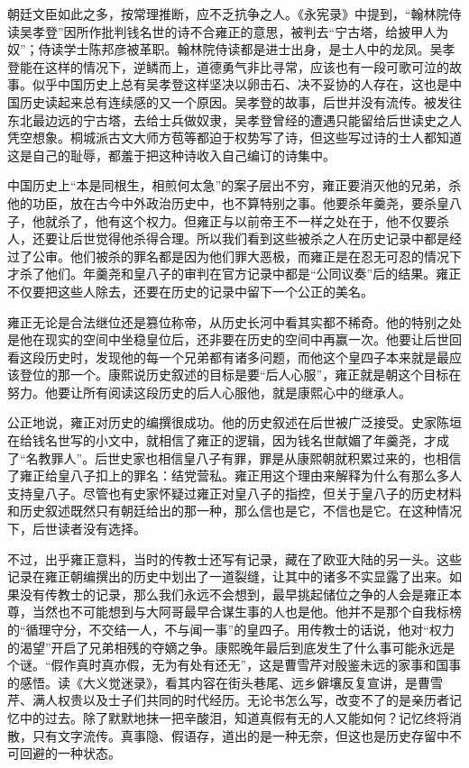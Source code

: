 朝廷文臣如此之多，按常理推断，应不乏抗争之人。《永宪录》中提到，“翰林院侍读吴孝登”因所作批判钱名世的诗不合雍正的意思，被判去“宁古塔，给披甲人为奴”；侍读学士陈邦彦被革职。翰林院侍读都是进士出身，是士人中的龙凤。吴孝登能在这样的情况下，逆鳞而上，道德勇气非比寻常，应该也有一段可歌可泣的故事。似乎中国历史上总有吴孝登这样坚决以卵击石、决不妥协的人存在，这也是中国历史读起来总有连续感的又一个原因。吴孝登的故事，后世并没有流传。被发往东北最边远的宁古塔，去给士兵做奴隶，吴孝登曾经的遭遇只能留给后世读史之人凭空想象。桐城派古文大师方苞等都迫于权势写了诗，但这些写过诗的士人都知道这是自己的耻辱，都羞于把这种诗收入自己编订的诗集中。



中国历史上“本是同根生，相煎何太急”的案子层出不穷，雍正要消灭他的兄弟，杀他的功臣，放在古今中外政治历史中，也不算特别之事。他要杀年羹尧，要杀皇八子，他就杀了，他有这个权力。但雍正与以前帝王不一样之处在于，他不仅要杀人，还要让后世觉得他杀得合理。所以我们看到这些被杀之人在历史记录中都是经过了公审。他们被杀的罪名都是因为他们罪大恶极，而雍正是在忍无可忍的情况下才杀了他们。年羹尧和皇八子的审判在官方记录中都是“公同议奏”后的结果。雍正不仅要把这些人除去，还要在历史的记录中留下一个公正的美名。



雍正无论是合法继位还是篡位称帝，从历史长河中看其实都不稀奇。他的特别之处是他在现实的空间中坐稳皇位后，还非要在历史的空间中再赢一次。他要让后世回看这段历史时，发现他的每一个兄弟都有诸多问题，而他这个皇四子本来就是最应该登位的那一个。康熙说历史叙述的目标是要“后人心服”，雍正就是朝这个目标在努力。他要让所有阅读这段历史的后人心服他，就是康熙心中的继承人。



公正地说，雍正对历史的编撰很成功。他的历史叙述在后世被广泛接受。史家陈垣在给钱名世写的小文中，就相信了雍正的逻辑，因为钱名世献媚了年羹尧，才成了“名教罪人”。后世史家也相信皇八子有罪，罪是从康熙朝就积累过来的，也相信了雍正给皇八子扣上的罪名：结党营私。雍正用这个理由来解释为什么有那么多人支持皇八子。尽管也有史家怀疑过雍正对皇八子的指控，但关于皇八子的历史材料和历史叙述既然只有朝廷给出的那一种，那么信也是它，不信也是它。在这种情况下，后世读者没有选择。


不过，出乎雍正意料，当时的传教士还写有记录，藏在了欧亚大陆的另一头。这些记录在雍正朝编撰出的历史中划出了一道裂缝，让其中的诸多不实显露了出来。如果没有传教士的记录，那么我们永远不会想到，最早挑起储位之争的人会是雍正本尊，当然也不可能想到与大阿哥最早合谋生事的人也是他。他并不是那个自我标榜的“循理守分，不交结一人，不与闻一事”的皇四子。用传教士的话说，他对“权力的渴望”开启了兄弟相残的夺嫡之争。康熙晚年最后到底发生了什么事可能永远是个谜。“假作真时真亦假，无为有处有还无”，这是曹雪芹对殷鉴未远的家事和国事的感悟。读《大义觉迷录》，看其内容在街头巷尾、远乡僻壤反复宣讲，是曹雪芹、满人权贵以及士子们共同的时代经历。无论书怎么写，改变不了的是亲历者记忆中的过去。除了默默地抹一把辛酸泪，知道真假有无的人又能如何？记忆终将消散，只有文字流传。真事隐、假语存，道出的是一种无奈，但这也是历史存留中不可回避的一种状态。

